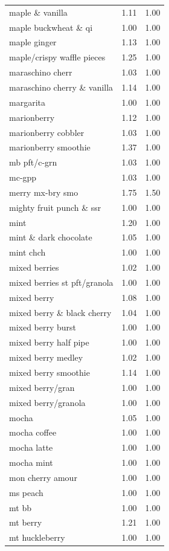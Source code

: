 \begin{table}
\begin{tabular}{lrr}
maple \& vanilla & 1.11 & 1.00 \\
maple buckwheat \& qi & 1.00 & 1.00 \\
maple ginger & 1.13 & 1.00 \\
maple/crispy waffle pieces & 1.25 & 1.00 \\
maraschino cherr & 1.03 & 1.00 \\
maraschino cherry \& vanilla & 1.14 & 1.00 \\
margarita & 1.00 & 1.00 \\
marionberry & 1.12 & 1.00 \\
marionberry cobbler & 1.03 & 1.00 \\
marionberry smoothie & 1.37 & 1.00 \\
mb pft/c-grn & 1.03 & 1.00 \\
mc-gpp & 1.03 & 1.00 \\
merry mx-bry smo & 1.75 & 1.50 \\
mighty fruit punch \& ssr & 1.00 & 1.00 \\
mint & 1.20 & 1.00 \\
mint \& dark chocolate & 1.05 & 1.00 \\
mint chch & 1.00 & 1.00 \\
mixed berries & 1.02 & 1.00 \\
mixed berries st pft/granola & 1.00 & 1.00 \\
mixed berry & 1.08 & 1.00 \\
mixed berry \& black cherry & 1.04 & 1.00 \\
mixed berry burst & 1.00 & 1.00 \\
mixed berry half pipe & 1.00 & 1.00 \\
mixed berry medley & 1.02 & 1.00 \\
mixed berry smoothie & 1.14 & 1.00 \\
mixed berry/gran & 1.00 & 1.00 \\
mixed berry/granola & 1.00 & 1.00 \\
mocha & 1.05 & 1.00 \\
mocha coffee & 1.00 & 1.00 \\
mocha latte & 1.00 & 1.00 \\
mocha mint & 1.00 & 1.00 \\
mon cherry amour & 1.00 & 1.00 \\
ms peach & 1.00 & 1.00 \\
mt bb & 1.00 & 1.00 \\
mt berry & 1.21 & 1.00 \\
mt huckleberry & 1.00 & 1.00 \\

\end{tabular}
\end{table}
